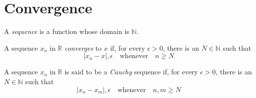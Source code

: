 \section*{Convergence}
\begin{definition*}[sequence] A \textit{sequence} is a function whose domain is $\mathbb{N}$.
\end{definition*}
\par\vspace{1 cm}
\begin{definition*} A sequence ${x_n}$ in $\mathbb{R}$ \textit{converges} to $x$ if, for every $\epsilon>0$, there is an $N\in\mathbb{N}$ such that
\[
|x_n-x| , \epsilon\quad\mbox{whenever}\quad n\geq N
\]
\end{definition*}
\begin{definition*} A sequence ${x_n}$ in $\mathbb{R}$ is said to be a \textit{Cauchy} sequence if, for every $\epsilon>0$, there is an $N\in\mathbb{N}$ such that
\[
|x_n-x_m| , \epsilon\quad\mbox{whenever}\quad n,m\geq N
\]
\end{definition*}
\par\vspace{1 cm}
